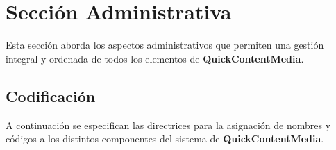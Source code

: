 \chapter{Sección Administrativa}

Esta sección aborda los aspectos administrativos que permiten una gestión integral y ordenada de todos los elementos de \textbf{QuickContentMedia}. 

\section{Codificación}

A continuación se especifican las directrices para la asignación de nombres y códigos a los distintos componentes del sistema de \textbf{QuickContentMedia}.












% 
% 
% 
% 


